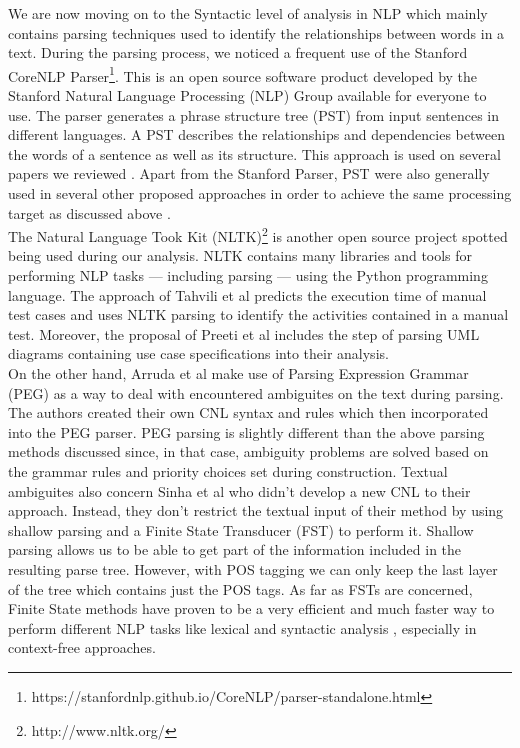 We are now moving on to the Syntactic level of analysis in NLP which mainly contains parsing techniques used to identify the relationships 
between words in a text. During the parsing process, we noticed a frequent use of the Stanford CoreNLP Parser\footnote{https://stanfordnlp.github.io/CoreNLP/parser-standalone.html}. 
This is an open source software product developed by the Stanford Natural Language Processing (NLP) Group available for everyone to use. The parser generates a phrase structure tree (PST) 
from input sentences in different languages. A PST describes the relationships and dependencies between the words of a sentence as well as its 
structure. This approach is used on several papers we reviewed \cite{soeken2012assisted, rane2017automatic, 9240680}. Apart from the Stanford Parser, 
PST were also generally used in several other proposed approaches in order to achieve the same processing target as discussed above 
\cite{harmain2000cm, mulla2020potent}.\\
The Natural Language Took Kit (NLTK)\footnote{http://www.nltk.org/} is another open source project spotted being used during our analysis. 
NLTK contains many libraries and tools for performing NLP tasks --- including parsing --- using the Python programming language. The approach of 
Tahvili et al \cite{8051381} predicts the execution time of manual test cases and uses NLTK parsing to identify the activities contained in 
a manual test. Moreover, the proposal of Preeti et al \cite{preeti2017building} includes the step of parsing UML diagrams containing use 
case specifications into their analysis.\\
On the other hand, Arruda et al \cite{arruda2020automation} make use of Parsing Expression Grammar (PEG) \cite{ford2004parsing} as a 
way to deal with encountered ambiguites on the text during parsing. The authors created their own CNL syntax and rules which then incorporated 
into the PEG parser. PEG parsing is slightly different than the above parsing methods discussed since, in that case, ambiguity problems are 
solved based on the grammar rules and priority choices set during construction. Textual ambiguites also concern Sinha et al \cite{sinha2009linguistic} 
who didn't develop a new CNL to their approach. Instead, they don't restrict the textual input of their method by using shallow parsing and a 
Finite State Transducer (FST) to perform it. Shallow parsing allows us to be able to get part of the information included in the resulting parse tree. 
However, with POS tagging we can only keep the last layer of the tree which contains just the POS tags. As far as FSTs are concerned, Finite 
State methods have proven to be a very efficient and much faster way to perform different NLP tasks like lexical and syntactic analysis \cite{hobbs1997extracting}, 
especially in context-free approaches.\\

